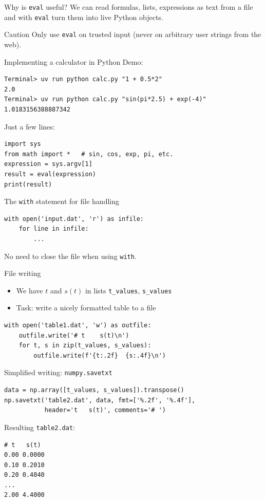 \begin{frame}{Why is \texttt{eval} useful?}
  We can read formulas, lists, expressions as text from a file and with
  \texttt{eval} turn them into live Python objects.

  \begin{alertblock}{Caution}
    Only use \texttt{eval} on trusted input (never on arbitrary user
    strings from the web).
  \end{alertblock}
\end{frame}

\begin{frame}[fragile]{Implementing a calculator in Python}
  Demo:
\begin{lstlisting}[style=terminal]
Terminal> uv run python calc.py "1 + 0.5*2"
2.0
Terminal> uv run python calc.py "sin(pi*2.5) + exp(-4)"
1.0183156388887342
\end{lstlisting}
  Just a few lines:
\begin{lstlisting}[style=pythoncompact]
import sys
from math import *   # sin, cos, exp, pi, etc.
expression = sys.argv[1]
result = eval(expression)
print(result)
\end{lstlisting}
\end{frame}

\begin{frame}[fragile]{The \texttt{with} statement for file handling}
\begin{lstlisting}[style=pythoncompact]
with open('input.dat', 'r') as infile:
    for line in infile:
        ...
\end{lstlisting}
  No need to close the file when using \texttt{with}.
\end{frame}

\begin{frame}[fragile]{File writing}
  \begin{itemize}
    \item We have $t$ and $s(t)$ in lists \texttt{t\_values}, \texttt{s\_values}
    \item Task: write a nicely formatted table to a file
  \end{itemize}
\begin{lstlisting}[style=pythonTiny]
with open('table1.dat', 'w') as outfile:
    outfile.write('# t    s(t)\n')
    for t, s in zip(t_values, s_values):
        outfile.write(f'{t:.2f}  {s:.4f}\n')
\end{lstlisting}
\end{frame}

\begin{frame}[fragile]{Simplified writing: \texttt{numpy.savetxt}}
\begin{lstlisting}[style=pythonTiny]
data = np.array([t_values, s_values]).transpose()
np.savetxt('table2.dat', data, fmt=['%.2f', '%.4f'],
           header='t   s(t)', comments='# ')
\end{lstlisting}
  Resulting \texttt{table2.dat}:
\begin{lstlisting}[style=terminal]
# t   s(t)
0.00 0.0000
0.10 0.2010
0.20 0.4040
...
2.00 4.4000
\end{lstlisting}
\end{frame}


